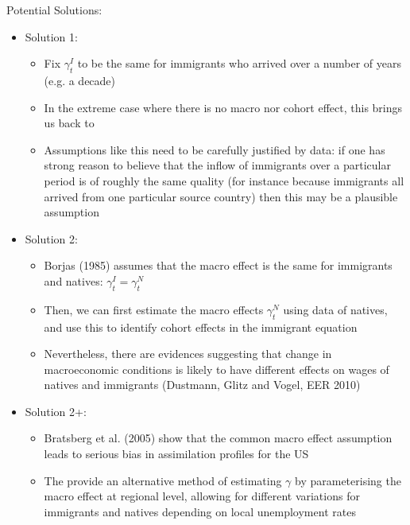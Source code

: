             Potential Solutions:

            \begin{itemize}
                \item Solution 1: 
                    \begin{itemize}
                        \item Fix $\gamma_{t}^I$ to be the same for immigrants who arrived over a number of years (e.g. a decade)
                        \item In the extreme case where there is no macro nor cohort effect, this brings us back to \cite{chiswick_effect_1978}
                        \item Assumptions like this need to be carefully justified by data: if one has strong reason to believe that the inflow of immigrants over a particular period is of roughly the same quality (for instance because immigrants all arrived from one particular source country) then this may be a plausible assumption
                    \end{itemize}
                \item Solution 2: 
                    \begin{itemize}
                        \item Borjas (1985) assumes that the macro effect is the same for immigrants and natives: $\gamma_{t}^I=\gamma_{t}^N$
                        \item Then, we can first estimate the macro effects $\gamma_{t}^N$ using data of natives, and use this to identify cohort effects in the immigrant equation
                        \item Nevertheless, there are evidences suggesting that change in macroeconomic conditions is likely to have different effects on wages of natives and immigrants (Dustmann, Glitz and Vogel, EER 2010)
                    \end{itemize}
                \item Solution 2+: 
                    \begin{itemize}
                        \item Bratsberg et al. (2005) show that the common macro effect assumption leads to serious bias in assimilation profiles for the US
                        \item The provide an alternative method of estimating $\gamma$ by parameterising the macro effect at regional level, allowing for different variations for immigrants and natives depending on local unemployment rates
                    \end{itemize}
            \end{itemize}

